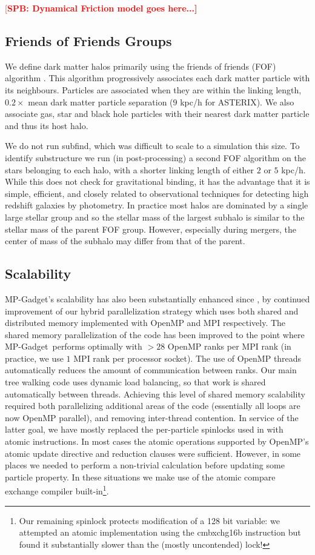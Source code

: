 \documentclass[fleqn,usenatbib]{mnras}
\newcommand{\software}[1]{{\small #1}}
\newcommand{\mpgadget}{\software{MP-Gadget}}
\newcommand{\asterix}{\software{ASTERIX}}
\newcommand{\spb}[1]{\textcolor{red}{[\bf SPB: #1]}}
\begin{document}
\spb{Dynamical Friction model goes here...}

\subsection{Friends of Friends Groups}
\label{sec:fof}

We define dark matter halos primarily using the friends of friends (FOF) algorithm \cite{Davis1985}. This algorithm progressively associates each dark matter particle with its neighbours. Particles are associated when they are within the linking length, $0.2 \times$ mean dark matter particle separation ($9$ kpc/h for \asterix). We also associate gas, star and black hole particles with their nearest dark matter particle and thus its host halo.

We do not run subfind, which was difficult to scale to a simulation this size. To identify substructure we run (in post-processing) a second FOF algorithm on the stars belonging to each halo, with a shorter linking length of either $2$ or $5$ kpc/h. While this does not check for gravitational binding, it has the advantage that it is simple, efficient, and closely related to observational techniques for detecting high redshift galaxies by photometry. In practice most halos are dominated by a single large stellar group and so the stellar mass of the largest subhalo is similar to the stellar mass of the parent FOF group. However, especially during mergers, the center of mass of the subhalo may differ from that of the parent.

\subsection{Scalability}

\mpgadget's scalability has also been substantially enhanced  since \cite{Feng:2016}, by continued improvement of our hybrid parallelization strategy which uses both shared and distributed memory implemented with OpenMP and MPI respectively. The shared memory parallelization of the code has been improved to the point where \mpgadget~performs optimally with $>28 $ OpenMP ranks per MPI rank (in practice, we use $1$ MPI rank per processor socket). The use of OpenMP threads automatically reduces the amount of communication between ranks. Our main tree walking code uses dynamic load balancing, so that work is shared automatically between threads. Achieving this level of shared memory scalability required both parallelizing additional areas of the code (essentially all loops are now OpenMP parallel), and removing inter-thread contention. In service of the latter goal, we have mostly replaced the per-particle spinlocks used in \cite{Feng:2016} with atomic instructions. In most cases the atomic operations supported by OpenMP's atomic update directive and reduction clauses were sufficient. However, in some places we needed to perform a non-trivial calculation before updating some particle property. In these situations we make use of the atomic compare exchange compiler built-in\footnote{Our remaining spinlock protects modification of a 128 bit variable: we attempted an atomic implementation using the cmbxchg16b instruction but found it substantially slower than the (mostly uncontended) lock!}.
\end{document}
